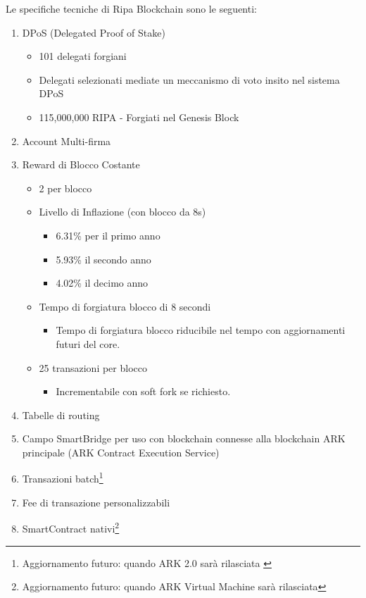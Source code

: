 \documentclass[11pt,fleqn,oneside]{book} %
\begin{document}
Le specifiche tecniche di Ripa Blockchain sono le seguenti:
\begin{enumerate}
	\item DPoS (Delegated Proof of Stake)
	\begin{itemize}
		\item 101 delegati forgiani
		\item Delegati selezionati mediate un meccanismo di voto insito nel sistema DPoS
		\item 115,000,000 RIPA - Forgiati nel Genesis Block
	\end{itemize}
	\item Account Multi-firma
	\item Reward di Blocco Costante
	\begin{itemize}
		\item 2 \PHP per blocco
		\item Livello di Inflazione (con blocco da 8s)
		\begin{itemize}
			\item 6.31\% per il primo anno
			\item 5.93\% il secondo anno
			\item 4.02\% il decimo anno
		\end{itemize}
		\item Tempo di forgiatura blocco di 8 secondi
		\begin{itemize}
			\item Tempo di forgiatura blocco riducibile nel tempo con aggiornamenti futuri del core.
		\end{itemize}
		\item 25 transazioni per blocco
		\begin{itemize}
			\item Incrementabile con soft fork se richiesto.
		\end{itemize}
	\end{itemize}
	\item Tabelle di routing
	\item Campo SmartBridge per uso con blockchain connesse alla blockchain ARK principale (ARK Contract Execution Service)
	\item Transazioni batch\footnote{Aggiornamento futuro: quando ARK 2.0 sarà rilasciata \label{note1}}
	\item Fee di transazione personalizzabili\footnotemark[\value{footnote}]
	\item SmartContract nativi\footnote{Aggiornamento futuro: quando ARK Virtual Machine sarà rilasciata}
\end{enumerate}
\end{document}
